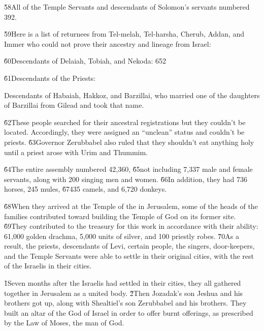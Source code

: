 \v{58}All of the Temple Servants and descendants of Solomon's servants numbered 392.

\v{59}Here is a list of returnees from Tel-melah, Tel-harsha, Cherub, Addan, and Immer who could not prove their ancestry and lineage from Israel:

\v{60}Descendants of Delaiah, Tobiah, and Nekoda: 652

\v{61}Descendants of the Priests:

Descendants of Habaiah, Hakkoz, and Barzillai, who married one of the daughters of Barzillai from Gilead and took that name.

\v{62}These people searched for their ancestral registrations but they couldn't be located. Accordingly, they were assigned an ``unclean'' status and couldn't be priests. \v{63}Governor Zerubbabel also ruled that they shouldn't eat anything holy until a priest arose with Urim and Thummim.

\v{64}The entire assembly numbered 42,360, \v{65}not including 7,337 male and female servants, along with 200 singing men and women. \v{66}In addition, they had 736 horses, 245 mules, \v{67}435 camels, and 6,720 donkeys.

\v{68}When they arrived at the Temple of the  in Jerusalem, some of the heads of the families contributed toward building the Temple of God on its former site. \v{69}They contributed to the treasury for this work in accordance with their ability: 61,000 golden drachma, 5,000 units of silver, and 100 priestly robes. \v{70}As a result, the priests, descendants of Levi, certain people, the singers, door-keepers, and the Temple Servants were able to settle in their original cities, with the rest of the Israelis in their cities.

\v{1}Seven months after the Israelis had settled in their cities, they all gathered together in Jerusalem as a united body. \v{2}Then Jozadak's son Jeshua and his brothers got up, along with Shealtiel's son Zerubbabel and his brothers. They built an altar of the God of Israel in order to offer burnt offerings, as prescribed by the Law of Moses, the man of God.

